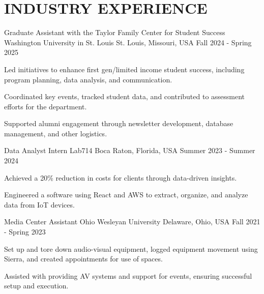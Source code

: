 \documentclass[10pt, letterpaper]{article}
\begin{document}
\section{INDUSTRY EXPERIENCE}

\begin{experienceentry}
    {Graduate Assistant with the Taylor Family Center for Student Success} %
    {Washington University in St. Louis} %
    {St. Louis, Missouri, USA} %
    {Fall 2024 - Spring 2025} %
    \item Led initiatives to enhance first gen/limited income student success, including program planning, data analysis, and communication.
    \item Coordinated key events, tracked student data, and contributed to assessment efforts for the department.
    \item Supported alumni engagement through newsletter development, database management, and other logistics.
\end{experienceentry}

\begin{experienceentry}
    {Data Analyst Intern} %
    {Lab714} %
    {Boca Raton, Florida, USA} %
    {Summer 2023 - Summer 2024} %
    \item Achieved a 20\% reduction in costs for clients through data-driven insights.
    \item Engineered a software using React and AWS to extract, organize, and analyze data from IoT devices.
\end{experienceentry}

\begin{experienceentry}
    {Media Center Assistant} %
    {Ohio Wesleyan University} %
    {Delaware, Ohio, USA} %
    {Fall 2021 - Spring 2023} %
    \item Set up and tore down audio-visual equipment, logged equipment movement using Sierra, and created appointments for use of spaces.
    \item Assisted with providing AV systems and support for events, ensuring successful setup and execution.
\end{experienceentry}
\end{document}
